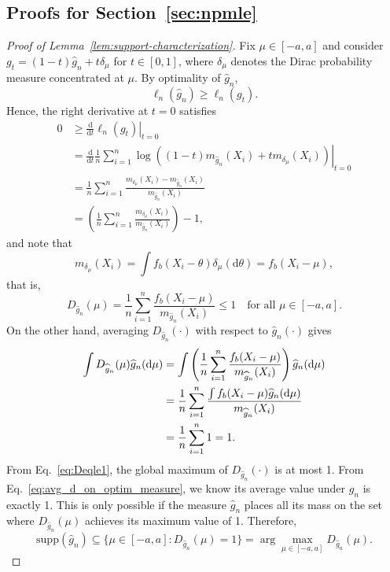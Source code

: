 \documentclass[english, 11pt]{article}
\newcommand{\supp}{\mathrm{supp}}
\newcommand{\mrd}{\mathrm{d}}
\theoremstyle{plain}
\theoremstyle{definition}
\theoremstyle{remark}
\begin{document}
\begin{appendix}

\section{Proofs for Section~\ref{sec:npmle}}\label{app:npmle}

\restatesuppportpw*

\begin{proof}[Proof of Lemma~\ref{lem:support-characterization}]
Fix $\mu\in[-a,a]$ and consider $g_t=(1-t)\widehat g_n+t\delta_\mu$ for $t\in[0,1]$, where $\delta_{\mu}$ denotes the Dirac probability measure concentrated at $\mu$. By optimality of $\widehat g_n$,
\begin{equation*}
\ell_n(\widehat g_n) \ge \ell_n(g_t).
\end{equation*}
Hence, the right derivative at $t=0$ satisfies
\begin{align*}
0 &\ge \left.\frac{\mrd}{\mrd t}\ell_n(g_t)\right|_{t=0}\\
&=\left.\frac{\mrd}{\mrd t}\frac{1}{n}\sum_{i=1}^n \log\left((1-t)m_{\widehat g_n}(X_i)+t m_{\delta_\mu}(X_i)\right)\right|_{t=0}\\
&=\frac{1}{n}\sum_{i=1}^n \frac{m_{\delta_\mu}(X_i)-m_{\widehat g_n}(X_i)}{m_{\widehat g_n}(X_i)} \\
&=\left(\frac{1}{n}\sum_{i=1}^n \frac{m_{\delta_\mu}(X_i)}{m_{\widehat g_n}(X_i)} \right) - 1,
\end{align*}
and note that
\begin{equation*}
m_{\delta_\mu}(X_i) = \int f_b(X_i-\theta)\delta_\mu(\mathrm{d}\theta)=f_b(X_i-\mu),
\end{equation*}
that is,
\begin{equation}\label{eq:Deqle1}
D_{\widehat g_n}(\mu) =\frac{1}{n}\sum_{i=1}^n \frac{f_b(X_i-\mu)}{m_{\widehat g_n}(X_i)} \le 1 \quad \text{for all }\mu\in[-a,a].
\end{equation}
On the other hand, averaging $D_{\widehat g_n}(\cdot)$ with respect to $\widehat g_n(\cdot)$ gives
\begin{align}\label{eq:avg_d_on_optim_measure}
\int D_{\widehat g_n}(\mu)\widehat g_n(\mathrm{d}\mu)
&= \int \left(\frac{1}{n}\sum_{i=1}^n \frac{f_b(X_i - \mu)}{m_{\widehat g_n}(X_i)}\right)\widehat g_n(\mathrm{d}\mu) \notag\\
&= \frac{1}{n}\sum_{i=1}^n \frac{\int f_b(X_i - \mu) \widehat g_n(\mathrm{d}\mu)}{m_{\widehat g_n}(X_i)} \\
&= \frac{1}{n}\sum_{i=1}^n 1 = 1.
\end{align}
From Eq.~\eqref{eq:Deqle1}, the global maximum of $D_{\widehat g_n}(\cdot)$ is at most 1. From Eq.~\eqref{eq:avg_d_on_optim_measure}, we know its average value under $\widehat g_n$ is exactly 1. This is only possible if the measure $\widehat g_n$ places all its mass on the set where $D_{\widehat g_n}(\mu)$ achieves its maximum value of 1. Therefore,
\begin{equation*}
\supp(\widehat g_n) \subseteq \{\mu \in [-a,a] : D_{\widehat g_n}(\mu) = 1\} = \arg\max_{\mu\in[-a,a]} D_{\widehat g_n}(\mu).
\end{equation*}
\end{proof}


\end{appendix}
\end{document}
